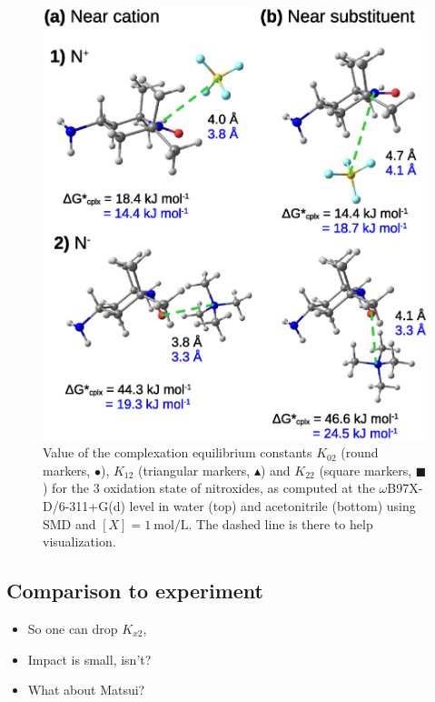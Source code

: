\documentclass[review]{elsarticle}
\begin{document}
\begin{figure}[!h]
\centering
\includegraphics[width=\linewidth]{Figure13}
\caption{Value of the complexation equilibrium constants $K_{02}$ (round markers, $\bullet$), $K_{12}$ (triangular markers, $\blacktriangle$) and $K_{22}$ (square markers, $\blacksquare$) for the 3 oxidation state of nitroxides, as computed at the $\omega$B97X-D/6-311+G(d) level in water (top) and acetonitrile (bottom) using SMD and $[X]=\SI{1}{\mole\per\liter}$.  The dashed line is there to help visualization. }
\label{fig:Kx2}
\end{figure}

\clearpage
\subsection{Comparison to experiment} \label{sec:exp}

\begin{itemize}
	\item So one can drop $K_{x2}$,
	\item Impact is small, isn't?
	\item What about Matsui?
\end{itemize}
\end{document}
